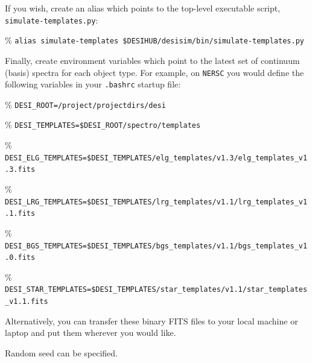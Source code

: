 \documentclass[11pt]{article}
\begin{document}
\noindent If you wish, create an alias which points to the top-level executable
script, {\tt simulate-templates.py}:
\begin{itemize*}
  \item[\%]{{\tt alias simulate-templates \$DESIHUB/desisim/bin/simulate-templates.py}}
\end{itemize*}

\noindent Finally, create environment variables which point to the latest set of
continuum (basis) spectra for each object type.  For example, on {\tt NERSC} you
would define the following variables in your {\tt .bashrc} startup file:
\begin{itemize*}
  \item[\%]{{\tt DESI\_ROOT=/project/projectdirs/desi}}
  \item[\%]{{\tt DESI\_TEMPLATES=\$DESI\_ROOT/spectro/templates}}
  \item[\%]{{\tt DESI\_ELG\_TEMPLATES=\$DESI\_TEMPLATES/elg\_templates/v1.3/elg\_templates\_v1.3.fits}}
  \item[\%]{{\tt DESI\_LRG\_TEMPLATES=\$DESI\_TEMPLATES/lrg\_templates/v1.1/lrg\_templates\_v1.1.fits}}
  \item[\%]{{\tt DESI\_BGS\_TEMPLATES=\$DESI\_TEMPLATES/bgs\_templates/v1.1/bgs\_templates\_v1.0.fits}}
  \item[\%]{{\tt DESI\_STAR\_TEMPLATES=\$DESI\_TEMPLATES/star\_templates/v1.1/star\_templates\_v1.1.fits}}
\end{itemize*}

\noindent Alternatively, you can transfer these binary FITS files to your local
machine or laptop and put them wherever you would like.  

Random seed can be specified.
\end{document}

